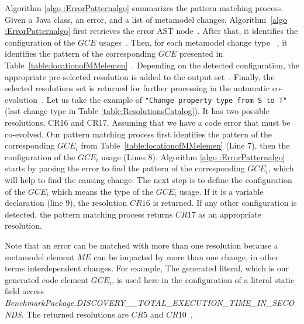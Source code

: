 Algorithm \ref{algo :ErrorPatternalgo} summarizes the pattern matching process. 
Given a Java class, an error, and a list of metamodel changes, Algorithm~\ref{algo :ErrorPatternalgo} first retrieves the error AST node~{\small{}}. After that, it identifies the configuration of the $GCE$ usages~{\small{}}. Then, for each metamodel change type ~{\small{}}, it identifies the pattern of the corresponding $GCE$ presented in Table~\ref{table:locationofMMelemen}~{\small{}}. %
Depending on the detected configuration, the appropriate pre-selected resolution is added to the output set~{\small{}}.
Finally, the selected resolutions set is returned for further processing in the automatic co-evolution~{\small{}}. 
Let us take the example of \texttt{"Change property type from S to T"} (last change type in Table \ref{table:ResolutionsCatalog}). It has two possible resolutions, CR16 and CR17. Assuming that we have a code error that must be co-evolved. Our pattern matching process first identifies the pattern of the corresponding $GCE_i$ from Table~\ref{table:locationofMMelemen} (Line 7), then the configuration of the $GCE_i$ usage (Lines 8). 
Algorithm \ref{algo :ErrorPatternalgo} starts by parsing the error to find the pattern of the corresponding $GCE_i$, which will help to find the causing change. The next step is to define the configuration of the $GCE_i$ which means the type of the $GCE_i$ usage. 
If it is a variable declaration (line 9), the resolution $CR16$ is returned. If any other configuration is detected, the pattern matching process returns $CR17$ as an appropriate resolution.

Note that an error can be matched with more than one resolution because a metamodel element $ME$ can be impacted by more than one change, in other terms interdependent changes. 
For example,  The generated literal, which is our generated code element $GCE_i$, is used here in the configuration of a literal static field access 
\emph{\footnotesize{BenchmarkPackage.DISCOVERY\_\_TOTAL\_EXECUTION\_TIME\_IN\_SECONDS}}. The returned resolutions are $CR5$ and $CR10$~{\small{}}, %

